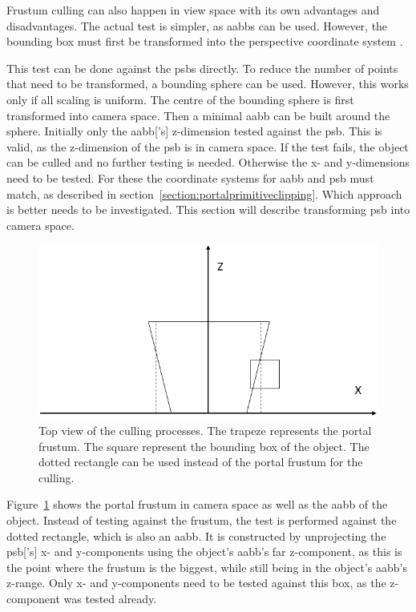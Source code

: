Frustum culling can also happen in view space with its own advantages and disadvantages. The actual test is simpler, as \glspl{aabb} can be used. However, the bounding box must first be transformed into the perspective coordinate system \cite{assarsson:2000:optimized}.


This test can be done against the \glspl{psb} directly. To reduce the number of points that need to be transformed, a bounding sphere can be used. However, this works only if all scaling is uniform. The centre of the bounding sphere is first transformed into camera space. Then a minimal \gls{aabb} can be built around the sphere. Initially only the \gls{aabb}['s] z-dimension tested against the \gls{psb}. This is valid, as the z-dimension of the \gls{psb} is in camera space. If the test fails, the object can be culled and no further testing is needed. Otherwise the x- and y-dimensions need to be tested. For these the coordinate systems for \gls{aabb} and \gls{psb} must match, as described in section~\ref{section:portalprimitiveclipping}. Which approach is better needs to be investigated. This section will describe transforming \gls{psb} into camera space. 

\begin{figure}[h]
	\includegraphics[width=\linewidth]{images/frustumbox.png}
	\caption{Top view of the culling processes. The trapeze represents the portal frustum. The square represent the bounding box of the object. The dotted rectangle can be used instead of the portal frustum for the culling. }
	\label{fig:frustumbox}
\end{figure}

Figure~\ref{fig:frustumbox} shows the portal frustum in camera space as well as the \gls{aabb} of the object. Instead of testing against the frustum, the test is performed against the dotted rectangle, which is also an \gls{aabb}. It is constructed by unprojecting the \gls{psb}['s] x- and y-components using the object's \gls{aabb}'s far z-component, as this is the point where the frustum is the biggest, while still being in the object's \gls{aabb}'s z-range. Only x- and y-components need to be tested against this box, as the z-component was tested already.


